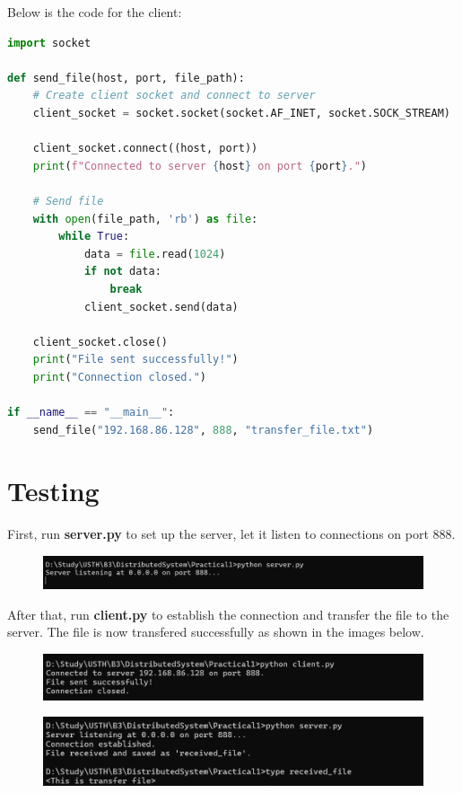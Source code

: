 \documentclass[12pt]{article}
\begin{document}
Below is the code for the client:
\newpage
\begin{lstlisting}[language=Python]
import socket

def send_file(host, port, file_path):
    # Create client socket and connect to server
    client_socket = socket.socket(socket.AF_INET, socket.SOCK_STREAM)
    
    client_socket.connect((host, port))
    print(f"Connected to server {host} on port {port}.")

    # Send file
    with open(file_path, 'rb') as file:
        while True:
            data = file.read(1024)
            if not data:
                break
            client_socket.send(data)

    client_socket.close()
    print("File sent successfully!")
    print("Connection closed.")

if __name__ == "__main__":
    send_file("192.168.86.128", 888, "transfer_file.txt")
\end{lstlisting}


\section{Testing}
First, run \textbf{server.py} to set up the server, let it listen to connections on port 888.
\begin{figure}[!ht]
\centering
\includegraphics[scale=0.5]{test_server_1.png}
\end{figure}

After that, run \textbf{client.py} to establish the connection and transfer the file to the server. The file is now transfered successfully as shown in the images below.
\begin{figure}[!ht]
\includegraphics[scale=0.5]{test_client.png}
\end{figure}

\vspace{-0.7cm}

\begin{figure}[!ht]
\includegraphics[scale=0.5]{test_server_2.png}
\end{figure}
\end{document}
